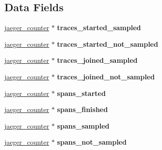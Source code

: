 \subsection*{Data Fields}
\begin{DoxyCompactItemize}
\item 
\mbox{\label{structjaeger__metrics_a6aec22e6be01c7926b9c97a9abe6b48f}} 
\mbox{\hyperlink{structjaeger__counter}{jaeger\+\_\+counter}} $\ast$ {\bfseries traces\+\_\+started\+\_\+sampled}
\item 
\mbox{\label{structjaeger__metrics_afec1c6ec9640195dc84142740ab7e50c}} 
\mbox{\hyperlink{structjaeger__counter}{jaeger\+\_\+counter}} $\ast$ {\bfseries traces\+\_\+started\+\_\+not\+\_\+sampled}
\item 
\mbox{\label{structjaeger__metrics_a5662180018d2ad04cb5b8b5dc837d3f2}} 
\mbox{\hyperlink{structjaeger__counter}{jaeger\+\_\+counter}} $\ast$ {\bfseries traces\+\_\+joined\+\_\+sampled}
\item 
\mbox{\label{structjaeger__metrics_a27d29942ffffda19a4837446eb66ab71}} 
\mbox{\hyperlink{structjaeger__counter}{jaeger\+\_\+counter}} $\ast$ {\bfseries traces\+\_\+joined\+\_\+not\+\_\+sampled}
\item 
\mbox{\label{structjaeger__metrics_a7bdd0ea8c240c8b0891c36bb0372525b}} 
\mbox{\hyperlink{structjaeger__counter}{jaeger\+\_\+counter}} $\ast$ {\bfseries spans\+\_\+started}
\item 
\mbox{\label{structjaeger__metrics_ae1d08e8f7978b3007bd918e089aafb1e}} 
\mbox{\hyperlink{structjaeger__counter}{jaeger\+\_\+counter}} $\ast$ {\bfseries spans\+\_\+finished}
\item 
\mbox{\label{structjaeger__metrics_a717a3241ce74f1de6a978e4ecad2454c}} 
\mbox{\hyperlink{structjaeger__counter}{jaeger\+\_\+counter}} $\ast$ {\bfseries spans\+\_\+sampled}
\item 
\mbox{\label{structjaeger__metrics_a3ddaffc27eef9908996e3fc3012f252c}} 
\mbox{\hyperlink{structjaeger__counter}{jaeger\+\_\+counter}} $\ast$ {\bfseries spans\+\_\+not\+\_\+sampled}

\end{DoxyCompactItemize}
